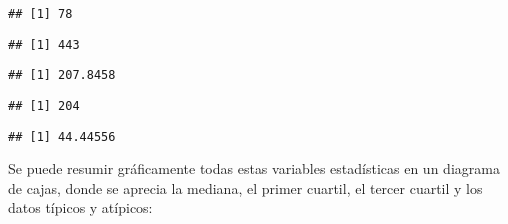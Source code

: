 \documentclass[
]{article}
\newenvironment{Shaded}{\begin{snugshade}}{\end{snugshade}}
\newcommand{\AttributeTok}[1]{\textcolor[rgb]{0.77,0.63,0.00}{#1}}
\newcommand{\ConstantTok}[1]{\textcolor[rgb]{0.00,0.00,0.00}{#1}}
\newcommand{\FunctionTok}[1]{\textcolor[rgb]{0.00,0.00,0.00}{#1}}
\newcommand{\NormalTok}[1]{#1}
\newcommand{\SpecialCharTok}[1]{\textcolor[rgb]{0.00,0.00,0.00}{#1}}
\begin{document}
\begin{verbatim}
## [1] 78
\end{verbatim}

\begin{Shaded}
\end{Shaded}

\begin{verbatim}
## [1] 443
\end{verbatim}

\begin{Shaded}
\end{Shaded}

\begin{verbatim}
## [1] 207.8458
\end{verbatim}

\begin{Shaded}
\end{Shaded}

\begin{verbatim}
## [1] 204
\end{verbatim}

\begin{Shaded}
\end{Shaded}

\begin{verbatim}
## [1] 44.44556
\end{verbatim}

Se puede resumir gráficamente todas estas variables estadísticas en un
diagrama de cajas, donde se aprecia la mediana, el primer cuartil, el
tercer cuartil y los datos típicos y atípicos:
\end{document}

